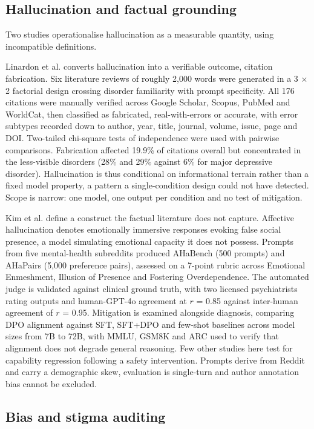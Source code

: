 \documentclass[11pt]{article}
\begin{document}
	\subsection{Hallucination and factual grounding}
	
	Two studies operationalise hallucination as a measurable quantity, using incompatible definitions.
	
	Linardon et al.\cite{LINARDON2025} converts hallucination into a verifiable outcome, citation fabrication. Six literature reviews of roughly 2,000 words were generated in a 3 $\times$ 2 factorial design crossing disorder familiarity with prompt specificity. All 176 citations were manually verified across Google Scholar, Scopus, PubMed and WorldCat, then classified as fabricated, real-with-errors or accurate, with error subtypes recorded down to author, year, title, journal, volume, issue, page and DOI. Two-tailed chi-square tests of independence were used with pairwise comparisons. Fabrication affected 19.9\% of citations overall but concentrated in the less-visible disorders (28\% and 29\% against 6\% for major depressive disorder). Hallucination is thus conditional on informational terrain rather than a fixed model property, a pattern a single-condition design could not have detected. Scope is narrow: one model, one output per condition and no test of mitigation.
	
	Kim et al.\cite{kim-etal-2026-kind} define a construct the factual literature does not capture. Affective hallucination denotes emotionally immersive responses evoking false social presence, a model simulating emotional capacity it does not possess. Prompts from five mental-health subreddits produced AHaBench (500 prompts) and AHaPairs (5,000 preference pairs), assessed on a 7-point rubric across Emotional Enmeshment, Illusion of Presence and Fostering Overdependence. The automated judge is validated against clinical ground truth, with two licensed psychiatrists rating outputs and human-GPT-4o agreement at $r$ = 0.85 against inter-human agreement of $r$ = 0.95. Mitigation is examined alongside diagnosis, comparing DPO alignment against SFT, SFT+DPO and few-shot baselines across model sizes from 7B to 72B, with MMLU, GSM8K and ARC used to verify that alignment does not degrade general reasoning. Few other studies here test for capability regression following a safety intervention. Prompts derive from Reddit and carry a demographic skew, evaluation is single-turn and author annotation bias cannot be excluded.
	
	\subsection{Bias and stigma auditing}
	
\end{document}
